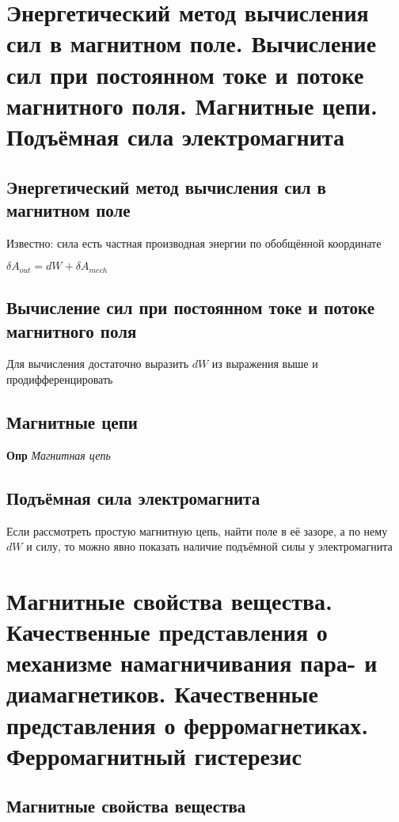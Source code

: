 \documentclass[a4paper, 14pt]{article}
\begin{document}
    \section{Энергетический метод вычисления сил в магнитном поле.
    Вычисление сил при постоянном токе и потоке магнитного поля.
    Магнитные цепи.
    Подъёмная сила электромагнита}
    
    \subsection{Энергетический метод вычисления сил в магнитном поле}
    
    Известно: сила есть частная производная энергии по обобщённой координате
    
    $\delta A_{out} = dW + \delta A_{mech}$
    
    \subsection{Вычисление сил при постоянном токе и потоке магнитного поля}
    
    Для вычисления достаточно выразить $dW$ из выражения выше и продифференцировать
    
    \subsection{Магнитные цепи}
    
    \textbf{Опр} \textit{Магнитная цепь}
    
    \subsection{Подъёмная сила электромагнита}
    
    Если рассмотреть простую магнитную цепь, найти поле в её зазоре, а по нему $dW$ и силу, то можно явно показать
    наличие подъёмной силы у электромагнита
    
    \section{Магнитные свойства вещества.
    Качественные представления о механизме намагничивания пара- и диамагнетиков.
    Качественные представления о ферромагнетиках.
    Ферромагнитный гистерезис}
    
    \subsection{Магнитные свойства вещества}
    
\end{document}
